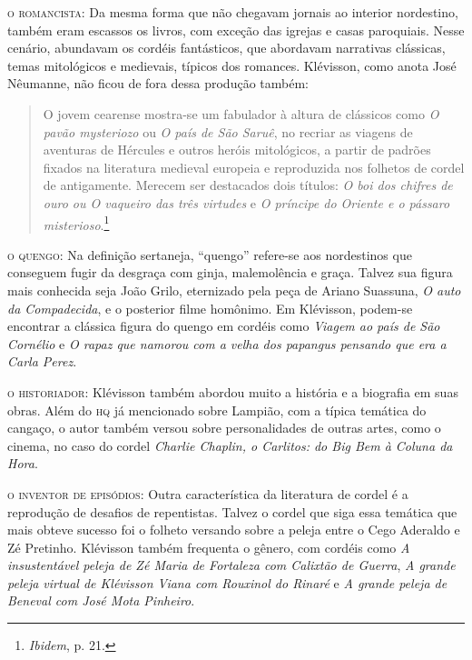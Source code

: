 \documentclass[11pt]{extarticle}
\begin{document}
\noindent\textsc{o romancista}: Da mesma forma que não chegavam jornais ao interior nordestino, também eram escassos os livros, com exceção das igrejas e casas paroquiais.
Nesse cenário, abundavam os cordéis fantásticos, que abordavam narrativas clássicas, temas mitológicos e medievais, típicos dos romances. 
Klévisson, como anota José Nêumanne, não ficou de fora dessa produção também:

\begin{quote}
O jovem cearense mostra-se um fabulador à altura de clássicos como \textit{O pavão mysteriozo} ou \textit{O país de São Saruê}, no recriar as viagens de aventuras de Hércules e outros heróis mitológicos, a partir de padrões fixados na literatura medieval europeia e reproduzida nos folhetos de cordel de antigamente. Merecem ser destacados dois títulos: \textit{O boi dos chifres de ouro ou O vaqueiro das três virtudes} e \textit{O príncipe do Oriente e o pássaro misterioso}.\footnote{\textit{Ibidem}, p. 21.}
\end{quote}

\noindent\textsc{o quengo}: Na definição sertaneja, ``quengo'' refere-se aos nordestinos que conseguem fugir da desgraça com ginja, malemolência e graça. Talvez sua figura mais conhecida seja João Grilo, eternizado pela peça de Ariano Suassuna, \textit{O auto da Compadecida}, e o posterior filme homônimo. Em Klévisson, podem-se encontrar a clássica figura do quengo em cordéis como \textit{Viagem ao país de São Cornélio} e \textit{O rapaz que namorou com a velha dos papangus pensando que era a Carla Perez}. 


\noindent\textsc{o historiador}: Klévisson também abordou muito a história e a biografia em suas obras. Além do \textsc{hq} já mencionado sobre Lampião, com a típica temática do cangaço, o autor também versou sobre personalidades de outras artes, como o cinema, no caso do cordel \textit{Charlie Chaplin, o Carlitos: do Big Bem à Coluna da Hora}.

\noindent\textsc{o inventor de episódios}: Outra característica da literatura de cordel é a reprodução de desafios de repentistas. Talvez o cordel que siga essa temática que mais obteve sucesso foi o folheto versando sobre a peleja entre o Cego Aderaldo e Zé Pretinho. Klévisson também frequenta o gênero, com cordéis como \textit{A insustentável
peleja de Zé Maria de Fortaleza com Calixtão de Guerra}, \textit{A grande peleja virtual de Klévisson Viana com Rouxinol do Rinaré} e \textit{A grande peleja de Beneval com José Mota Pinheiro}.
\end{document}
